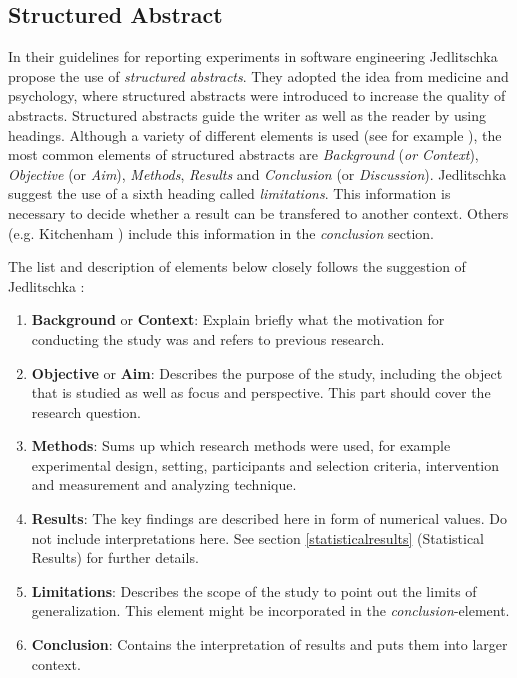 
\subsection{Structured Abstract}
\label{subsec:structured abstract}

In their guidelines for reporting experiments in software engineering Jedlitschka \etal \cite{Jedlitschka2008} propose the use of \emph{structured abstracts}. They adopted the idea from medicine and psychology, where structured abstracts were introduced to increase the quality of abstracts. Structured abstracts guide the writer as well as the reader by using headings. Although a variety of different elements is used (see for example ), the most common elements of structured abstracts are \emph{Background} (\emph{or Context}), \emph{Objective} (or \emph{Aim}), \emph{Methods}, \emph{Results} and \emph{Conclusion} (or \emph{Discussion}). Jedlitschka \etal \cite{Jedlitschka2008} suggest the use of a sixth heading called \emph{limitations}. This information is necessary to decide whether a result can be transfered to another context. Others (e.g. Kitchenham \etal \cite{KBO2008}) include this information in the \emph{conclusion} section.

The list and description of elements below closely follows the suggestion of Jedlitschka \etal \cite{Jedlitschka2008}:
\begin{enumerate}
	\item \textbf{Background} or \textbf{Context}: Explain briefly what the motivation for conducting the study was and refers to previous research.
	\item \textbf{Objective} or \textbf{Aim}: Describes the purpose of the study, including the object that is studied as well as focus and perspective. This part should cover the research question.
	\item \textbf{Methods}: Sums up which research methods were used, for example experimental design, setting, participants and selection criteria, intervention and measurement and analyzing technique.
	\item \textbf{Results}: The key findings are described here in form of numerical values. Do not include interpretations here. See section \ref{statisticalresults} (Statistical Results) for further details.
	\item \textbf{Limitations}: Describes the scope  of the study to point out the limits of generalization. This element might be incorporated in the \emph{conclusion}-element.
	\item \textbf{Conclusion}:  Contains the interpretation of results and puts them into larger context.
\end{enumerate}

